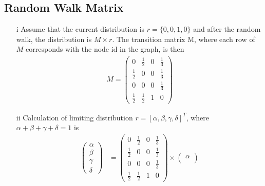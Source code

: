 \documentclass[a4paper,11pt]{article}
\begin{document}

\subsection{Random Walk Matrix}

\begin{itemize}
    \item[i] Assume that the current distribution is $r = \{0, 0, 1, 0\}$ and after the random walk, the distribution is $M \times r$. The transition matrix M, where each row of $M$ corresponds with the node id in the graph, is then
            \begin{align*}
                M = 
                \begin{pmatrix}
                    0 & \frac{1}{2} & 0 & \frac{1}{3} \\
                    \frac{1}{2} & 0 & 0 & \frac{1}{3} \\
                    0 & 0 & 0 & \frac{1}{3} \\
                    \frac{1}{2} & \frac{1}{2} & 1 & 0
                \end{pmatrix}    
            \end{align*} 
    \item[ii] Calculation of limiting distribution $r = [\alpha, \beta, \gamma, \delta]^T$, where $\alpha + \beta + \gamma + \delta = 1$ is
            \begin{align*} 
                \begin{pmatrix}
                    \alpha \\
                    \beta \\
                    \gamma \\
                    \delta
                \end{pmatrix} 
                &=
                \begin{pmatrix}
                    0 & \frac{1}{2} & 0 & \frac{1}{3} \\
                    \frac{1}{2} & 0 & 0 & \frac{1}{3} \\
                    0 & 0 & 0 & \frac{1}{3} \\
                    \frac{1}{2} & \frac{1}{2} & 1 & 0
                \end{pmatrix} 
                \times 
                \begin{pmatrix}
                    \alpha \\

\end{pmatrix}
\end{align*}
\end{itemize}
\end{document}
